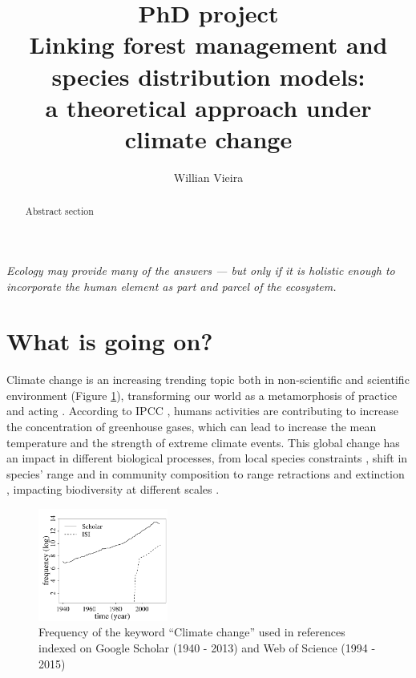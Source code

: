 




\title{
  PhD project \\
  Linking forest management and species distribution models: \\
  a theoretical approach under climate change
}

\author{Willian Vieira}

\maketitle

\begin{abstract}

Abstract section

\end{abstract}

\begin{displayquote}
\centering\textit{Ecology may provide many of the answers — but only if it is holistic enough to incorporate the human element as part and parcel of the ecosystem.} \\ 
\end{displayquote}

\section{What is going on?}
Climate change is an increasing trending topic both in non-scientific \citep{Capstick2015} and scientific environment (Figure \ref{fig:fig1}), transforming our world as a metamorphosis of practice and acting \citep{Beck2016}.
According to IPCC \citep{Cubasch2013}, humans activities are contributing to increase the concentration of greenhouse gases, which can lead to increase the mean temperature and the strength of extreme climate events.
This global change has an impact in different biological processes, from local species constraints \citep[e.g. low regeneration][]{Treyger2011}, shift in species' range \citep{Boisvert-Marsh2014,Monleon2015} and in community composition \citep{Dieleman2015} to range retractions and extinction \citep{Thomas2006}, impacting biodiversity at different scales \citep{Penuelas2013}.

\begin{figure}
    \centering
    \includegraphics[width=0.38\textwidth]{img/fig1_em.pdf}
    \caption{Frequency of the keyword ``Climate change'' used in references indexed on Google Scholar (1940 - 2013) and Web of Science (1994 - 2015)}
    \label{fig:fig1}
\end{figure}

